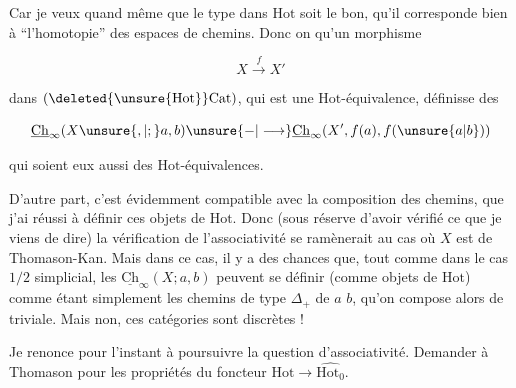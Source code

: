 

Car je veux quand même que le type dans $\mathrm{Hot}$ soit le bon, qu'il corresponde bien à ``l'homotopie'' des espaces de chemins. Donc  on  qu'un morphisme

\[
X\xrightarrow{f}X'
\]

dans $(\deleted{\unsure{\mathrm{Hot}}}\mathrm{Cat})$, qui est une $\mathrm{Hot}$-équivalence, définisse des

\[
\underline{\mathrm{Ch}}_\infty(X\unsure{,|;}a,b)\unsure{-|\longrightarrow}\underline{\mathrm{Ch}}_\infty(X',f(a),f(\unsure{a|b}))
\]

qui soient eux aussi des $\mathrm{Hot}$-équivalences.

D'autre part, c'est évidemment compatible avec la  composition des chemins, que j'ai réussi à définir  ces objets de $\mathrm{Hot}$. Donc  (sous réserve d'avoir vérifié ce que je viens de dire) la vérification de l'associativité se ramènerait au cas où $X$ est de Thomason-Kan. Mais dans ce cas, il y a des chances que, tout comme dans le cas $1/2$ simplicial, les $\underline{\mathrm{Ch}}_\infty(X;a,b)$ peuvent se définir  (comme objets de $\mathrm{Hot}$) comme étant simplement les chemins de type $\Delta_+$ de $a$  $b$, qu'on compose alors de  triviale. Mais non, ces catégories sont discrètes !

Je renonce pour l'instant à poursuivre  la question d'associativité. Demander à Thomason pour les propriétés du foncteur $\mathrm{Hot}\longrightarrow\widehat{\mathrm{Hot}_0}$.

